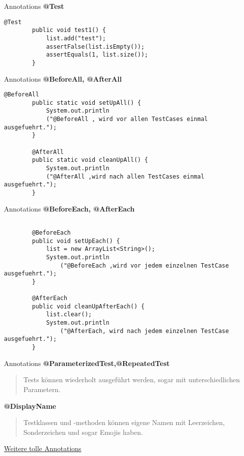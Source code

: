 \documentclass[10pt]{beamer}
\begin{document}
\begin{frame}[fragile]{Annotations}
     \textcolor{mygreen}{\textbf{@Test}}
    \begin{lstlisting}[basicstyle=\ttfamily\scriptsize,gobble=8]
    	@Test		
    	public void test1() {					
            list.add("test");					
            assertFalse(list.isEmpty());			
            assertEquals(1, list.size());			
    	}
    \end{lstlisting}
\end{frame}

\begin{frame}[fragile]{Annotations}
     \textcolor{mygreen}{\textbf{@BeforeAll, @AfterAll}}
    \begin{lstlisting}[basicstyle=\ttfamily\scriptsize,gobble=8]
    	@BeforeAll		
    	public static void setUpAll() {							
            System.out.println
            ("@BeforeAll , wird vor allen TestCases einmal ausgefuehrt.");					
    	}

    	@AfterAll
    	public static void cleanUpAll() {							
            System.out.println
            ("@AfterAll ,wird nach allen TestCases einmal ausgefuehrt.");					
    	}		
    \end{lstlisting}
\end{frame}

\begin{frame}[fragile]{Annotations}
     \textcolor{mygreen}{\textbf{@BeforeEach, @AfterEach}}
    \begin{lstlisting}[basicstyle=\ttfamily\scriptsize,gobble=8]

    	@BeforeEach		
    	public void setUpEach() {					
        	list = new ArrayList<String>();					
        	System.out.println
                ("@BeforeEach ,wird vor jedem einzelnen TestCase ausgefuehrt.");					
    	}

    	@AfterEach
    	public void cleanUpAfterEach() {					
        	list.clear();			
        	System.out.println
                ("@AfterEach, wird nach jedem einzelnen TestCase ausgefuehrt.");					
    	}				
    \end{lstlisting}
\end{frame}

\begin{frame}[fragile]{Annotations}
    \textcolor{mygreen}{\textbf{@ParameterizedTest,@RepeatedTest}}
    
    \begin{quote}
    Tests können wiederholt ausgeführt werden, sogar mit unterschiedlichen Parametern.
    \end{quote}
    \textcolor{mygreen}{\textbf{@DisplayName}}

    \begin{quote}
    Testklassen und -methoden können eigene Namen mit Leerzeichen, Sonderzeichen und sogar Emojis haben.
    \end{quote}

    \href{https://dzone.com/articles/junit-5-annotations-with-examples-1}{Weitere tolle Annotations}\\
\end{frame}
\end{document}
